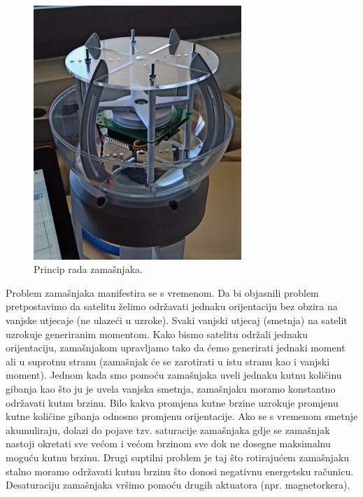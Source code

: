 \documentclass[times, utf8, diplomski, numeric]{templates/template}
\begin{document}
{{{{                \begin{figure}[htb]
                \centering
                \includegraphics[width=0.7\textwidth]{images/zamasnjak.png}
                \caption{Princip rada zamašnjaka.}
                \label{fig:zamasnjak_fig}
                \end{figure}

                Problem zamašnjaka manifestira se s vremenom. Da bi objasnili problem pretpostavimo da satelitu želimo održavati jednaku orijentaciju bez obzira na vanjske utjecaje (ne ulazeći u uzroke). Svaki vanjski utjecaj (smetnja) na satelit uzrokuje generiranim momentom. Kako bismo satelitu održali jednaku orijentaciju, zamašnjakom upravljamo tako da ćemo generirati jednaki moment ali u suprotnu stranu (zamašnjak će se zarotirati u istu stranu kao i vanjski moment). Jednom kada smo pomoću zamašnjaka uveli jednaku kutnu količinu gibanja kao što ju je uvela vanjska smetnja, zamašnjaku moramo konstantno održavati kutnu brzinu. Bilo kakva promjena kutne brzine uzrokuje promjenu kutne količine gibanja odnosno promjenu orijentacije. Ako se s vremenom smetnje akumuliraju, dolazi do pojave tzv. saturacije zamašnjaka gdje se zamašnjak nastoji okretati sve većom i većom brzinom sve dok ne dosegne maksimalnu moguću kutnu brzinu. Drugi suptilni problem je taj što rotirajućem zamašnjaku stalno moramo održavati kutnu brzinu što donosi negativnu energetsku računicu. Desaturaciju zamašnjaka vršimo pomoću drugih aktuatora (npr. magnetorkera).

}}}}
\end{document}

